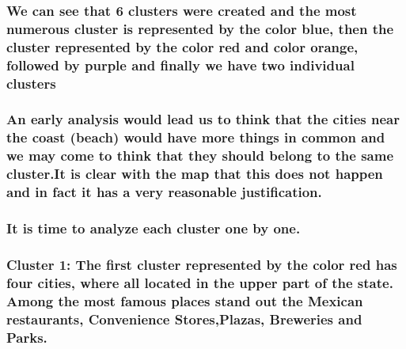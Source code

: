 \documentclass[11pt]{article}
\begin{document}
    \hypertarget{we-can-see-that-6-clusters-were-created-and-the-most-numerous-cluster-is-represented-by-the-color-blue-then-the-cluster-represented-by-the-color-red-and-color-orange-followed-by-purple-and-finally-we-have-two-individual-clusters}{%
\subsubsection{We can see that 6 clusters were created and the most
numerous cluster is represented by the color blue, then the cluster
represented by the color red and color orange, followed by purple and
finally we have two individual
clusters}\label{we-can-see-that-6-clusters-were-created-and-the-most-numerous-cluster-is-represented-by-the-color-blue-then-the-cluster-represented-by-the-color-red-and-color-orange-followed-by-purple-and-finally-we-have-two-individual-clusters}}

\hypertarget{an-early-analysis-would-lead-us-to-think-that-the-cities-near-the-coast-beach-would-have-more-things-in-common-and-we-may-come-to-think-that-they-should-belong-to-the-same-cluster.it-is-clear-with-the-map-that-this-does-not-happen-and-in-fact-it-has-a-very-reasonable-justification.}{%
\subsubsection{An early analysis would lead us to think that the cities
near the coast (beach) would have more things in common and we may come
to think that they should belong to the same cluster.It is clear with
the map that this does not happen and in fact it has a very reasonable
justification.}\label{an-early-analysis-would-lead-us-to-think-that-the-cities-near-the-coast-beach-would-have-more-things-in-common-and-we-may-come-to-think-that-they-should-belong-to-the-same-cluster.it-is-clear-with-the-map-that-this-does-not-happen-and-in-fact-it-has-a-very-reasonable-justification.}}

\hypertarget{it-is-time-to-analyze-each-cluster-one-by-one.}{%
\subsubsection{It is time to analyze each cluster one by
one.}\label{it-is-time-to-analyze-each-cluster-one-by-one.}}

\hypertarget{cluster-1-the-first-cluster-represented-by-the-color-red-has-four-cities-where-all-located-in-the-upper-part-of-the-state.-among-the-most-famous-places-stand-out-the-mexican-restaurants-convenience-storesplazas-breweries-and-parks.}{%
\subsubsection{Cluster 1: The first cluster represented by the color red
has four cities, where all located in the upper part of the state. Among
the most famous places stand out the Mexican restaurants, Convenience
Stores,Plazas, Breweries and
Parks.}\label{cluster-1-the-first-cluster-represented-by-the-color-red-has-four-cities-where-all-located-in-the-upper-part-of-the-state.-among-the-most-famous-places-stand-out-the-mexican-restaurants-convenience-storesplazas-breweries-and-parks.}}
\end{document}
